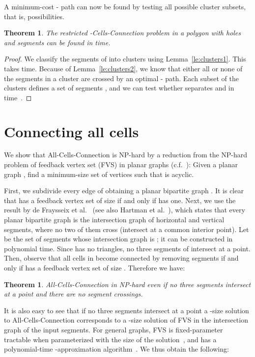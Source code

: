 \documentclass[11pt,a4paper]{article}
\newtheorem{theorem}[definition]{Theorem}
\begin{document}
A minimum-cost - path can now be found by testing all possible cluster subsets, that is,  possibilities.

\begin{theorem}
The restricted {\sc -Cells-Connection} problem in a polygon with  holes and  segments can be found in  time.
\end{theorem}
\begin{proof}
We classify the segments of  into  clusters using Lemma~\ref{le:clusters1}. This takes  time. Because 
of Lemma~\ref{le:clusters2}, we know that either all or none of the segments in a cluster are crossed by an optimal - path. Each subset of the clusters defines 
a set of segments , and we can test whether  separates  and  in  time~\cite{single-face1,single-face2}. 
\end{proof}


\section{Connecting all cells}\label{allcells}

We show that {\sc All-Cells-Connection} is NP-hard by a reduction from the NP-hard problem of feedback vertex set (FVS) in planar graphs (c.f.~\cite{V01}): Given a planar graph , find a minimum-size set of vertices  such that  is acyclic. 

First, we subdivide every edge of  obtaining a planar bipartite graph . It is clear that  has a feedback vertex set of size  if and only if  has one.  Next, we use the result by de Fraysseix et al.~\cite{dFMP91} (see also Hartman et al.~\cite{HNZ91}), 
which states that every planar bipartite graph is the intersection graph of horizontal and vertical segments, where no two of them cross (intersect at a common interior point). Let  be the set of segments whose intersection graph is ; it can be constructed in polynomial time. Since  has no triangles, no three segments of  intersect at a point. Then, observe that all cells in  become connected by removing  segments if and only if  has a feedback vertex set of size . Therefore we have:

\begin{theorem}
{\sc All-Cells-Connection} in NP-hard even if no three segments intersect at a point and there are no segment crossings.
\end{theorem}

It is also easy to see that if no three segments intersect at a point a -size solution to {\sc All-Cells-Connection}
corresponds to a -size solution of FVS in the intersection graph of the input segments. 
For general graphs, FVS is fixed-parameter tractable when parameterized with the size of the solution~\cite{CFLLV08}, and has a polynomial-time -approximation algorithm~\cite{V01}. We thus obtain the following:
\end{document}
